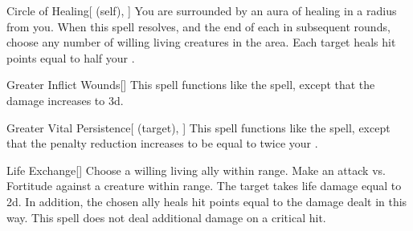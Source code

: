 \lowercase{\hypertarget{spell:Circle of Healing}{}}\label{spell:Circle of Healing}
\begin{attuneability}[\nth{4}]{\hypertarget{spell:Circle of Healing}{Circle of Healing}}[ (self), ]
You are surrounded by an aura of healing in a \areamed radius  from you.
When this spell resolves, and the end of each  in subsequent rounds, choose any number of willing living creatures in the area.
Each target heals hit points equal to half your .
\end{attuneability}
\vspace{0.25em}



\lowercase{\hypertarget{spell:Greater Inflict Wounds}{}}\label{spell:Greater Inflict Wounds}
\begin{freeability}[\nth{4}]{\hypertarget{spell:Greater Inflict Wounds}{Greater Inflict Wounds}}[]
This spell functions like the  spell, except that the damage increases to  \plus3d.
\end{freeability}
\vspace{0.25em}



\lowercase{\hypertarget{spell:Greater Vital Persistence}{}}\label{spell:Greater Vital Persistence}
\begin{attuneability}[\nth{4}]{\hypertarget{spell:Greater Vital Persistence}{Greater Vital Persistence}}[ (target), ]
This spell functions like the  spell, except that the penalty reduction increases to be equal to twice your .
\end{attuneability}
\vspace{0.25em}



\lowercase{\hypertarget{spell:Life Exchange}{}}\label{spell:Life Exchange}
\begin{freeability}[\nth{4}]{\hypertarget{spell:Life Exchange}{Life Exchange}}[]
Choose a willing living ally within \rngmed range.
Make an attack vs. Fortitude against a creature within \rngmed range.
\hit The target takes life damage equal to  \plus2d.
In addition, the chosen ally heals hit points equal to the damage dealt in this way.
\crit This spell does not deal additional damage on a critical hit.
\end{freeability}
\vspace{0.25em}




